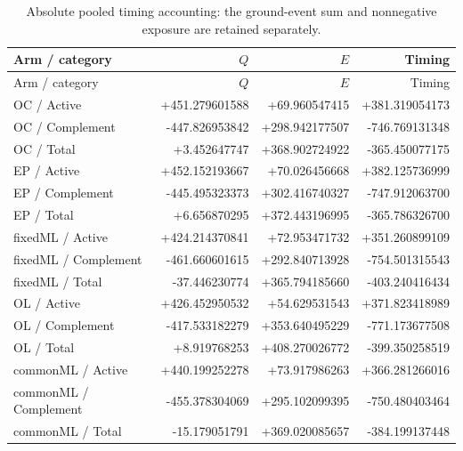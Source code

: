 \begingroup\small\setlength{\tabcolsep}{3pt}
\begin{longtable}{@{}p{}rrr@{}}
\caption{Absolute pooled timing accounting: the ground-event sum and nonnegative exposure are retained separately.}\\
\toprule Arm / category & $Q$ & $E$ & Timing \\\midrule\endfirsthead
\toprule Arm / category & $Q$ & $E$ & Timing \\\midrule\endhead
OC / Active & +451.279601588 & +69.960547415 & +381.319054173 \\
OC / Complement & -447.826953842 & +298.942177507 & -746.769131348 \\
OC / Total & +3.452647747 & +368.902724922 & -365.450077175 \\
EP / Active & +452.152193667 & +70.026456668 & +382.125736999 \\
EP / Complement & -445.495323373 & +302.416740327 & -747.912063700 \\
EP / Total & +6.656870295 & +372.443196995 & -365.786326700 \\
fixedML / Active & +424.214370841 & +72.953471732 & +351.260899109 \\
fixedML / Complement & -461.660601615 & +292.840713928 & -754.501315543 \\
fixedML / Total & -37.446230774 & +365.794185660 & -403.240416434 \\
OL / Active & +426.452950532 & +54.629531543 & +371.823418989 \\
OL / Complement & -417.533182279 & +353.640495229 & -771.173677508 \\
OL / Total & +8.919768253 & +408.270026772 & -399.350258519 \\
commonML / Active & +440.199252278 & +73.917986263 & +366.281266016 \\
commonML / Complement & -455.378304069 & +295.102099395 & -750.480403464 \\
commonML / Total & -15.179051791 & +369.020085657 & -384.199137448 \\
\bottomrule\end{longtable}\endgroup
\begingroup\small\setlength{\tabcolsep}{3pt}
